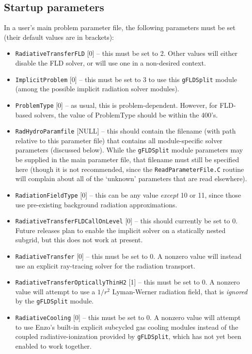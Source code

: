 \documentclass[letterpaper,10pt]{article}
\renewcommand{\(}{\left(}
\renewcommand{\)}{\right)}
\begin{document}
\subsection{Startup parameters}

In a user's main problem parameter file, the following parameters
must be set (their default values are in brackets):
\begin{itemize}
\item {\tt RadiativeTransferFLD} [0] -- this must be set to 2.  Other
  values will either disable the FLD solver, or will use one in a
  non-desired context.
\item {\tt ImplicitProblem} [0] -- this must be set to 3 to use this
  {\tt gFLDSplit} module (among the possible implicit radiation solver
  modules).
\item {\tt ProblemType} [0] -- as usual, this is problem-dependent.
  However, for FLD-based solvers, the value of ProblemType
  should be within the 400's.
\item {\tt RadHydroParamfile} [NULL] -- this should contain the filename
  (with path relative to this parameter file) that contains all
  module-specific solver parameters (discussed below).  While the 
  {\tt gFLDSplit} module parameters may be supplied in the main
  parameter file, that filename must still be specified here (though
  it is not recommended, since the {\tt ReadParameterFile.C} routine
  will complain about all of the `unknown' parameters that are read
  elsewhere).
\item {\tt RadiationFieldType} [0] -- this can be any value {\em except}
  10 or 11, since those use pre-existing background radiation
  approximations.
\item {\tt RadiativeTransferFLDCallOnLevel} [0] -- this should currently
  be set to 0.  Future releases plan to enable the implicit solver on
  a statically nested subgrid, but this does not work at present.
\item {\tt RadiativeTransfer} [0] -- this must be set to 0.  A nonzero
  value will instead use an explicit ray-tracing solver for the
  radiation transport. 
\item {\tt RadiativeTransferOpticallyThinH2} [1] -- this must be set
  to 0.  A nonzero value will attempt to use a $1/r^2$ Lyman-Werner
  radiation field, that is {\em ignored} by the {\tt gFLDSplit} module.
\item {\tt RadiativeCooling} [0] -- this must be set to 0.  A nonzero
  value will attempt to use Enzo's built-in explicit subcycled gas
  cooling modules instead of the coupled radiative-ionization provided
  by {\tt gFLDSplit}, which has not yet been enabled to work together. 
\end{itemize}
\end{document}
